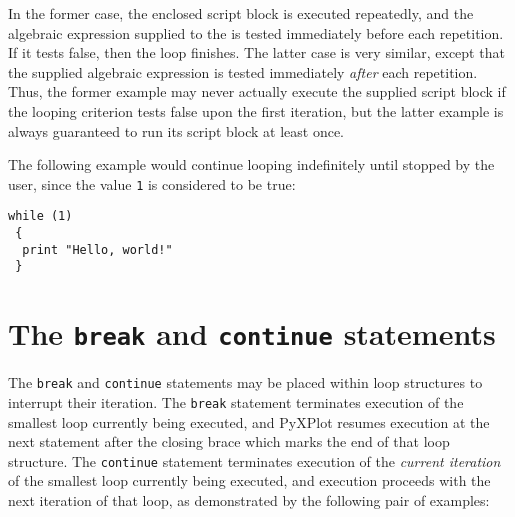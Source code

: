 In the former case, the enclosed script block is executed repeatedly, and the
algebraic expression supplied to the  is tested immediately
before each repetition. If it tests false, then the loop finishes.  The latter
case is very similar, except that the supplied algebraic expression is tested
immediately {\it after} each repetition. Thus, the former example may never
actually execute the supplied script block if the looping criterion tests false
upon the first iteration, but the latter example is always guaranteed to run
its script block at least once.

The following example would continue looping indefinitely until stopped by the
user, since the value {\tt 1} is considered to be true:

\begin{verbatim}
while (1)
 {
  print "Hello, world!"
 }
\end{verbatim}

\section{The {\tt break} and {\tt continue} statements}
\label{sec:breakcontinue}

The {\tt break} and {\tt continue} statements may be placed within loop
structures to interrupt their iteration. The {\tt break} statement terminates
execution of the smallest loop currently being executed, and PyXPlot resumes
execution at the next statement after the closing brace which marks the end of
that loop structure. The {\tt continue} statement terminates execution of the
{\it current iteration} of the smallest loop currently being executed, and
execution proceeds with the next iteration of that loop, as demonstrated by the
following pair of examples:

\vspace{3mm}
\newline
{}\newline
{}\newline
{}\newline
{}\newline
{}\newline
{}\newline
{}\newline
{}\newline
{}\newline
{}\newline
{}\newline
{}
\vspace{3mm}

